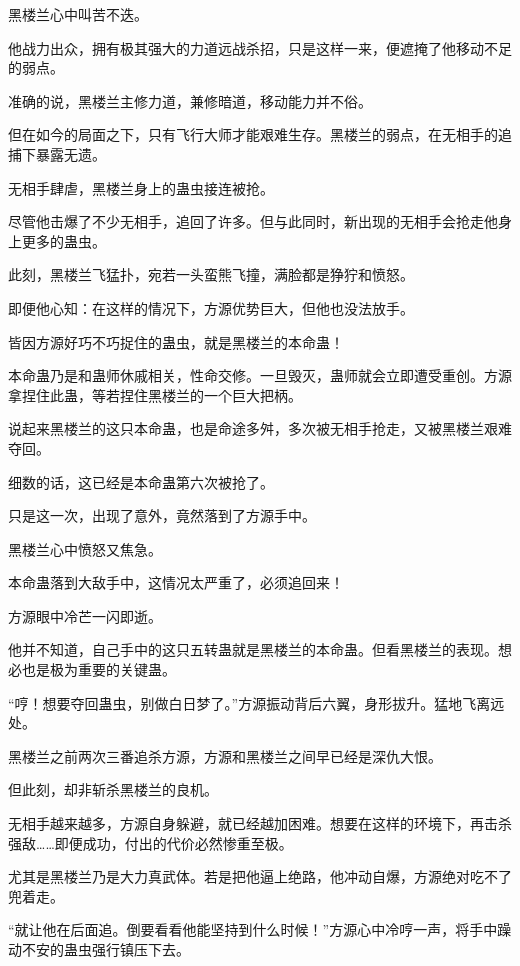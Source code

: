
\begin{this_body}

黑楼兰心中叫苦不迭。

他战力出众，拥有极其强大的力道远战杀招，只是这样一来，便遮掩了他移动不足的弱点。

准确的说，黑楼兰主修力道，兼修暗道，移动能力并不俗。

但在如今的局面之下，只有飞行大师才能艰难生存。黑楼兰的弱点，在无相手的追捕下暴露无遗。

无相手肆虐，黑楼兰身上的蛊虫接连被抢。

尽管他击爆了不少无相手，追回了许多。但与此同时，新出现的无相手会抢走他身上更多的蛊虫。

此刻，黑楼兰飞猛扑，宛若一头蛮熊飞撞，满脸都是狰狞和愤怒。

即便他心知：在这样的情况下，方源优势巨大，但他也没法放手。

皆因方源好巧不巧捉住的蛊虫，就是黑楼兰的本命蛊！

本命蛊乃是和蛊师休戚相关，性命交修。一旦毁灭，蛊师就会立即遭受重创。方源拿捏住此蛊，等若捏住黑楼兰的一个巨大把柄。

说起来黑楼兰的这只本命蛊，也是命途多舛，多次被无相手抢走，又被黑楼兰艰难夺回。

细数的话，这已经是本命蛊第六次被抢了。

只是这一次，出现了意外，竟然落到了方源手中。

黑楼兰心中愤怒又焦急。

本命蛊落到大敌手中，这情况太严重了，必须追回来！

方源眼中冷芒一闪即逝。

他并不知道，自己手中的这只五转蛊就是黑楼兰的本命蛊。但看黑楼兰的表现。想必也是极为重要的关键蛊。

“哼！想要夺回蛊虫，别做白日梦了。”方源振动背后六翼，身形拔升。猛地飞离远处。

黑楼兰之前两次三番追杀方源，方源和黑楼兰之间早已经是深仇大恨。

但此刻，却非斩杀黑楼兰的良机。

无相手越来越多，方源自身躲避，就已经越加困难。想要在这样的环境下，再击杀强敌……即便成功，付出的代价必然惨重至极。

尤其是黑楼兰乃是大力真武体。若是把他逼上绝路，他冲动自爆，方源绝对吃不了兜着走。

“就让他在后面追。倒要看看他能坚持到什么时候！”方源心中冷哼一声，将手中躁动不安的蛊虫强行镇压下去。


\end{this_body}
